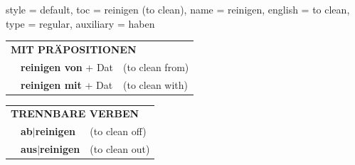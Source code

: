 \begin{verbentry}{
  style = {default},
  toc = {reinigen (to clean)},
  name = {reinigen},
  english = {to clean},
  type = {regular},
  auxiliary = {haben}
}
\vspace{10pt}

\begin{tabular}{lll}
\multicolumn{3}{l}{\textbf{MIT PRÄPOSITIONEN}}\\
& \textbf{reinigen von} + Dat & (to clean from)\\
& \textbf{reinigen mit} + Dat & (to clean with)\\
\end{tabular}
\hfill
\begin{tabular}{lll}
\multicolumn{3}{l}{\textbf{TRENNBARE VERBEN}}\\
& \textbf{ab$|$reinigen} & (to clean off)\\
& \textbf{aus$|$reinigen} & (to clean out)\\
\end{tabular}
\vspace{-5pt}
\end{verbentry}

